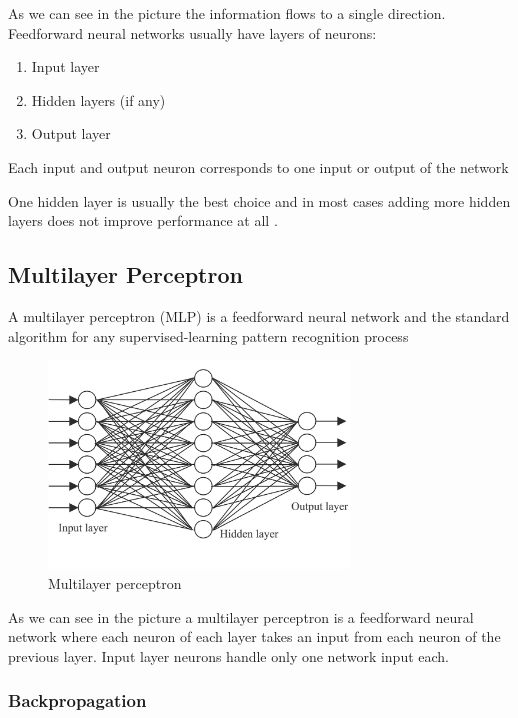 As we can see in the picture the information flows to a single direction. Feedforward neural networks usually have layers of neurons:

\begin{enumerate}
\item Input layer
\item Hidden layers (if any)
\item Output layer
\end{enumerate}

Each input and output neuron corresponds to one input or output of the network  \cite{wiki:ffnn}

One hidden layer is usually the best choice and in most cases adding more hidden layers does not improve performance at all \cite{ham2001} .

\subsection{Multilayer Perceptron}
\label{sec:mlp}

A multilayer perceptron (MLP) is a feedforward neural network and the standard algorithm for any supervised-learning pattern recognition process \cite{wiki:mlp}

\begin{figure}[h]
  \centering
  \includegraphics[width=8cm]{mlp}
  \caption{Multilayer perceptron}
\end{figure}

As we can see in the picture a multilayer perceptron is a feedforward neural network where each neuron of each layer takes an input from each neuron of the previous layer. Input layer neurons handle only one network input each.


\subsubsection{Backpropagation}
\label{sec:backprop}

